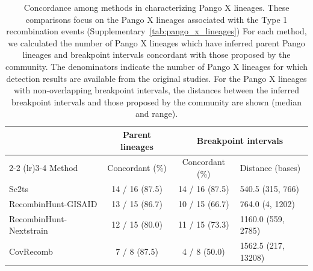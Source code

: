 \documentclass[12pt]{article}
\newcommand{\siref}[1]{Supplementary~\ref{#1}}
\begin{document}
\begin{table}
\caption{
Concordance among methods in characterizing Pango X lineages.
These comparisons focus on the Pango X lineages associated with
the Type 1 recombination events (\siref{tab:pango_x_lineages})
For each method, we calculated the number of Pango X lineages
which have inferred parent Pango lineages and breakpoint intervals
concordant with those proposed by the community.
The denominators indicate the number of Pango X lineages
for which detection results are available from the original
studies\cite{Alfonsi2024,Li2024CovRecomb}.
For the Pango X lineages with non-overlapping breakpoint intervals,
the distances between the inferred breakpoint intervals and
those proposed by the community are shown (median and range).
}
\label{tab:method_concordance}
\centering
\begin{tabular}{lccl}
\toprule & \multicolumn{1}{c}{Parent lineages} & \multicolumn{2}{c}{Breakpoint intervals} \\
\cmidrule(lr){2-2} \cmidrule(lr){3-4}
Method & Concordant (\%) & Concordant (\%) & Distance (bases) \\
\midrule
Sc2ts & 14 / 16 (87.5) & 14 / 16 (87.5) & 540.5 (315, 766)\\
RecombinHunt-GISAID & 13 / 15 (86.7) & 10 / 15 (66.7) & 764.0 (4, 1202)\\
RecombinHunt-Nextstrain & 12 / 15 (80.0) & 11 / 15 (73.3) & 1160.0 (559, 2785)\\
CovRecomb & 7 / 8 (87.5) & 4 / 8 (50.0) & 1562.5 (217, 13208)\\
\bottomrule
\end{tabular}
\end{table}
\end{document}
